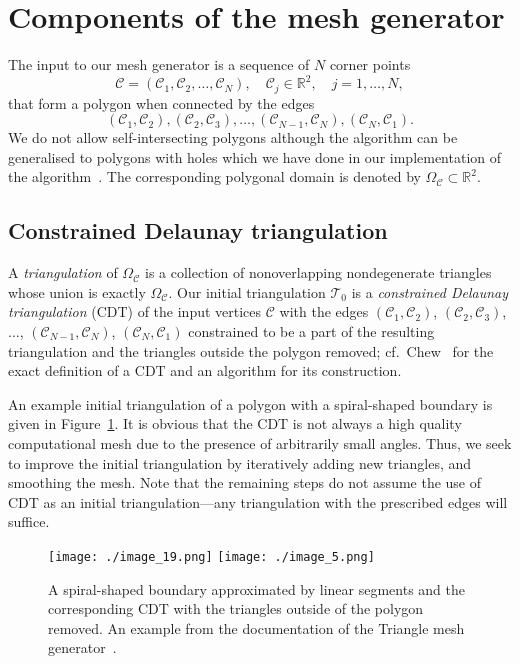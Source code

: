 \documentclass[11pt]{article}
\begin{document}
\section{Components of the mesh generator}
\label{sec:components}

The input to
our mesh generator is a sequence of \(N\) corner points
$$\mathcal{C} = (\mathcal{C}_1, \mathcal{C}_2, \dots, \mathcal{C}_N), \quad \mathcal{C}_j \in \mathbb{R}^2, \quad j = 1,\dots,N,$$
that form a polygon when connected by the edges
$$(\mathcal{C}_1, \mathcal{C}_2), (\mathcal{C}_2,\mathcal{C}_3),
\dots, (\mathcal{C}_{N-1}, \mathcal{C}_N), (\mathcal{C}_N,\mathcal{C}_1).$$
We do not allow self-intersecting polygons although
the algorithm can be generalised to polygons
with holes which we have done in our implementation
of the algorithm~\cite{adaptmesh2020}.
The corresponding polygonal domain is denoted
by \(\Omega_{\mathcal{C}} \subset \mathbb{R}^2\).

\subsection{Constrained Delaunay triangulation}
\label{sec:cdt}

A \emph{triangulation} of \(\Omega_{\mathcal{C}}\) is a
collection of nonoverlapping nondegenerate triangles whose union is exactly
\(\Omega_{\mathcal{C}}\).  Our initial triangulation \(\mathcal{T}_0\) is a
\emph{constrained Delaunay triangulation} (CDT) of the input vertices
\(\mathcal{C}\) with the edges \((\mathcal{C}_1, \mathcal{C}_2)\),
\((\mathcal{C}_2,\mathcal{C}_3)\), \(\dots\), \((\mathcal{C}_{N-1},
\mathcal{C}_N)\), \((\mathcal{C}_N, \mathcal{C}_1)\) constrained to be a part of
the resulting triangulation and the triangles outside the polygon removed;
cf.~Chew~\cite{Chew_1987} for the exact definition of a CDT and an algorithm for
its construction.

An example initial triangulation of a polygon with a spiral-shaped boundary is
given in Figure~\ref{fig:cdt}. It is obvious that the CDT is not always a high
quality computational mesh due to the presence of arbitrarily small angles.
Thus, we seek to improve the initial triangulation by iteratively adding new
triangles, and smoothing the mesh.  Note that the remaining steps do not assume
the use of CDT as an initial triangulation---any triangulation with the
prescribed edges will suffice.

\begin{figure}[htbp]
  \centering
  \texttt{[image: ./image\_19.png]}
  \texttt{[image: ./image\_5.png]}
\caption{A spiral-shaped boundary approximated by linear segments and the
  corresponding CDT with the triangles outside of the polygon removed.  An
  example from the documentation of the Triangle mesh
  generator~\cite{shewchuk1996triangle}.}
\label{fig:cdt}
\end{figure}
\end{document}
